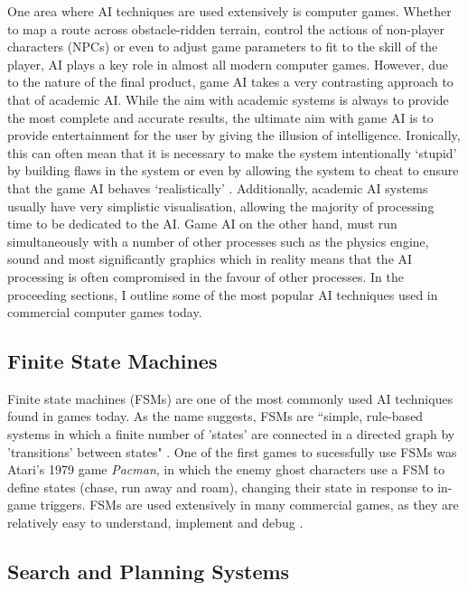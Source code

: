 \documentclass[a4paper,oneside]{report}
\begin{document}
One area where AI techniques are used extensively is computer games. Whether to map a route across obstacle-ridden terrain, control the actions of non-player characters (NPCs) or even to adjust game parameters to fit to the skill of the player, AI plays a key role in almost all modern computer games. However, due to the nature of the final product, game AI takes a very contrasting approach to that of academic AI. While the aim with academic systems is always to provide the most complete and accurate results, the ultimate aim with game AI is to provide entertainment for the user by giving the illusion of intelligence. Ironically, this can often mean that it is necessary to make the system intentionally `stupid' by building flaws in the system or even by allowing the system to cheat to ensure that the game AI behaves `realistically' \cite{Liden:2004fk}. Additionally, academic AI systems usually have very simplistic visualisation, allowing the majority of processing time to be dedicated to the AI. Game AI on the other hand, must run simultaneously with a number of other processes such as the physics engine, sound and most significantly graphics which in reality means that the AI processing is often compromised in the favour of other processes. In the proceeding sections, I outline some of the most popular AI techniques used in commercial computer games today.

\subsection{Finite State Machines} 

Finite state machines (FSMs) are one of the most commonly used AI techniques found in games today. As the name suggests, FSMs are ``simple, rule-based systems in which a finite number of 'states' are connected in a directed graph by 'transitions' between states" \cite{:hc}. One of the first games to sucessfully use FSMs was Atari's 1979 game \emph{Pacman}, in which the enemy ghost characters use a FSM to define states (chase, run away and roam), changing their state in response to in-game triggers. FSMs are used extensively in many commercial games, as they are relatively easy to understand, implement and debug \cite{Bourg:2004tg}.

\subsection{Search and Planning Systems} 
\end{document}
